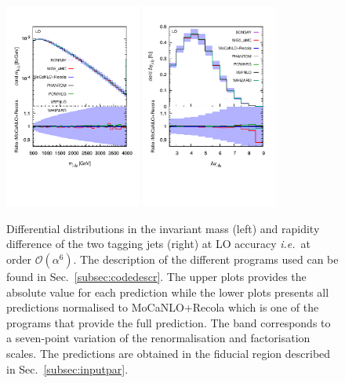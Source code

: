 \documentclass[twocolumn,epjc3]{svjour3} %
\newlength{\width}
\begin{document}
     \begin{figure}
       \centering
       \includegraphics[width=0.4\textwidth,angle=0,clip=true,trim={0.4cm 2cm 0.cm 1.cm}]{figures/LO/mjj_LO.pdf}
       \includegraphics[width=0.4\textwidth,angle=0,clip=true,trim={0.3cm 2cm 0.cm 1.cm}]{figures/LO/dyj1j2_LO.pdf}
    \caption{\label{fig:wg1_mjj-llLO} Differential distributions in the invariant mass (left) and rapidity difference of the two tagging jets (right) at LO accuracy \emph{i.e.}\ at order $\mathcal{O}(\alpha^6)$.
    The description of the different programs used can be found in Sec.~\protect\ref{subsec:codedescr}.
    The upper plots provides the absolute value for each prediction while the lower plots presents all predictions normalised to {\sc MoCaNLO}+{\sc Recola} which is one of the programs that provide the full prediction.
    The band corresponds to a seven-point variation of the renormalisation and factorisation scales.
    The predictions are obtained in the fiducial region described in Sec.~\protect\ref{subsec:inputpar}.}
    \end{figure}
\end{document}
